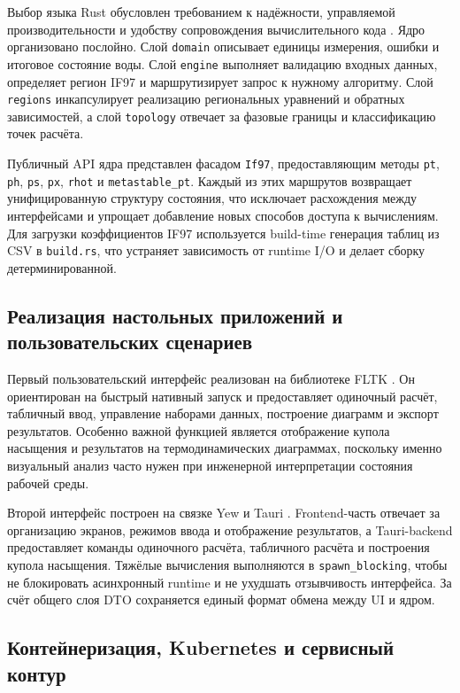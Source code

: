 Выбор языка Rust обусловлен требованием к надёжности, управляемой
производительности и удобству сопровождения вычислительного кода
\cite{rust_book}.
Ядро организовано послойно.
Слой \texttt{domain} описывает единицы измерения, ошибки и итоговое состояние воды.
Слой \texttt{engine} выполняет валидацию входных данных, определяет регион IF97 и
маршрутизирует запрос к нужному алгоритму.
Слой \texttt{regions} инкапсулирует реализацию региональных уравнений и обратных
зависимостей, а слой \texttt{topology} отвечает за фазовые границы и классификацию
точек расчёта.

Публичный API ядра представлен фасадом \texttt{If97}, предоставляющим методы
\texttt{pt}, \texttt{ph}, \texttt{ps}, \texttt{px}, \texttt{rhot} и
\texttt{metastable\_pt}.
Каждый из этих маршрутов возвращает унифицированную структуру состояния, что
исключает расхождения между интерфейсами и упрощает добавление новых способов
доступа к вычислениям.
Для загрузки коэффициентов IF97 используется build-time генерация таблиц из CSV
в \texttt{build.rs}, что устраняет зависимость от runtime I/O и делает сборку
детерминированной.

\subsection{Реализация настольных приложений и пользовательских сценариев}

Первый пользовательский интерфейс реализован на библиотеке FLTK
\cite{fltk_rs_docs}.
Он ориентирован на быстрый нативный запуск и предоставляет одиночный расчёт,
табличный ввод, управление наборами данных, построение диаграмм и экспорт
результатов.
Особенно важной функцией является отображение купола насыщения и результатов на
термодинамических диаграммах, поскольку именно визуальный анализ часто нужен
при инженерной интерпретации состояния рабочей среды.

Второй интерфейс построен на связке Yew и Tauri \cite{tauri_docs}.
Frontend-часть отвечает за организацию экранов, режимов ввода и отображение
результатов, а Tauri-backend предоставляет команды одиночного расчёта,
табличного расчёта и построения купола насыщения.
Тяжёлые вычисления выполняются в \texttt{spawn\_blocking}, чтобы не блокировать
асинхронный runtime и не ухудшать отзывчивость интерфейса.
За счёт общего слоя DTO сохраняется единый формат обмена между UI и ядром.

\subsection{Контейнеризация, Kubernetes и сервисный контур}

